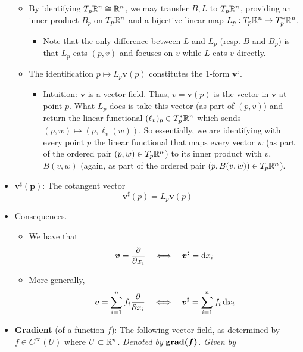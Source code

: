 \documentclass[../notes.tex]{subfiles}
\begin{document}
\begin{itemize}
\begin{itemize}
        \item By identifying $T_p\mathbb{R}^n\cong\mathbb{R}^n$, we may transfer $B,L$ to $T_p\mathbb{R}^n$, providing an inner product $B_p$ on $T_p\mathbb{R}^n$ and a bijective linear map $L_p:T_p\mathbb{R}^n\to T_p^*\mathbb{R}^n$.
        \begin{itemize}
            \item Note that the only difference between $L$ and $L_p$ (resp. $B$ and $B_p$) is that $L_p$ eats $(p,v)$ and focuses on $v$ while $L$ eats $v$ directly.
        \end{itemize}
        \item The identification $p\mapsto L_p\bm{v}(p)$ constitutes the 1-form $\bm{\pmb{v}^\sharp}$.
        \begin{itemize}
            \item Intuition: $\bm{v}$ is a vector field. Thus, $v=\bm{v}(p)$ is the vector in $\bm{v}$ at point $p$. What $L_p$ does is take this vector (as part of $(p,v)$) and return the linear functional $(\ell_v)_p\in T_p^*\mathbb{R}^n$ which sends $(p,w)\mapsto(p,\ell_v(w))$. So essentially, we are identifying with every point $p$ the linear functional that maps every vector $w$ (as part of the ordered pair $(p,w)\in T_p\mathbb{R}^n$) to its inner product with $v$, $B(v,w)$ (again, as part of the ordered pair $(p,B(v,w))\in T_p\mathbb{R}^n$).
        \end{itemize}
    \end{itemize}
    \item $\bm{\pmb{v}^\sharp(p)}$: The cotangent vector
    \begin{equation*}
        \pmb{v}^\sharp(p) = L_p\bm{v}(p)
    \end{equation*}
    \item Consequences.
    \begin{itemize}
        \item We have that
        \begin{equation*}
            \bm{v} = \pdv{x_i} \quad\Longleftrightarrow\quad \bm{v}^\sharp = \dd{x_i}
        \end{equation*}
        \item More generally,
        \begin{equation*}
            \bm{v} = \sum_{i=1}^nf_i\pdv{x_i} \quad\Longleftrightarrow\quad \bm{v}^\sharp = \sum_{i=1}^nf_i\dd{x_i}
        \end{equation*}
    \end{itemize}
    \item \textbf{Gradient} (of a function $f$): The following vector field, as determined by $f\in C^\infty(U)$ where $U\subset\mathbb{R}^n$. \emph{Denoted by} $\bm{\grd(f)}$. \emph{Given by}

\end{itemize}
\end{document}
